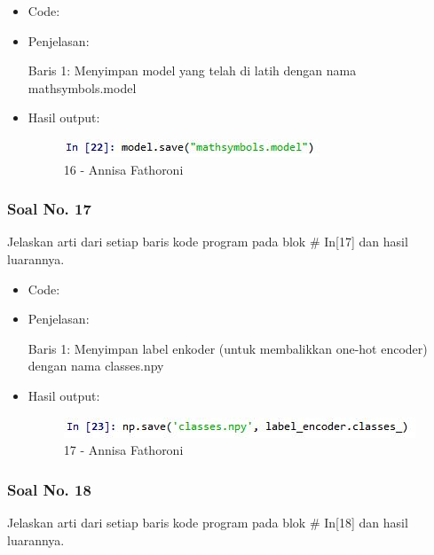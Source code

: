 \begin{itemize}
\item Code:


\item Penjelasan:

Baris 1: Menyimpan model yang telah di latih dengan nama mathsymbols.model

\item Hasil output:

\begin{figure}[!hbtp]
\centering
\includegraphics[scale=0.7]{figures/Chapter 7/1164067/Praktek/Chapter7AnnisaFathoroni16.jpg}
\caption{16 - Annisa Fathoroni}
\label{16 - Annisa Fathoroni}
\end{figure}

\end{itemize}

\subsubsection{Soal No. 17}
Jelaskan arti dari setiap baris kode program pada blok \# In[17] dan hasil luarannya.

\begin{itemize}
\item Code:


\item Penjelasan:

Baris 1: Menyimpan label enkoder (untuk membalikkan one-hot encoder) dengan nama classes.npy

\item Hasil output:

\begin{figure}[!hbtp]
\centering
\includegraphics[scale=0.7]{figures/Chapter 7/1164067/Praktek/Chapter7AnnisaFathoroni17.jpg}
\caption{17 - Annisa Fathoroni}
\label{17 - Annisa Fathoroni}
\end{figure}

\end{itemize}

\subsubsection{Soal No. 18}
Jelaskan arti dari setiap baris kode program pada blok \# In[18] dan hasil luarannya.

